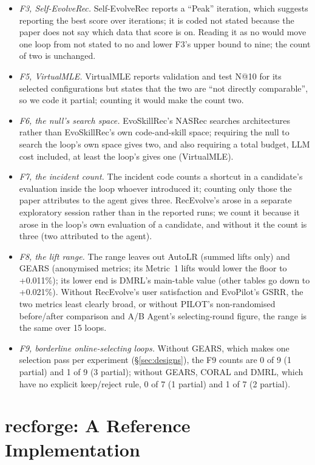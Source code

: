 \documentclass[sigconf,nonacm]{acmart}
\begin{document}
\begin{itemize}
\item \emph{F3, Self-EvolveRec.} Self-EvolveRec reports a ``Peak'' iteration, which suggests reporting the best score over iterations; it is coded not stated because the paper does not say which data that score is on. Reading it as no would move one loop from not stated to no and lower F3's upper bound to nine; the count of two is unchanged.
\item \emph{F5, VirtualMLE.} VirtualMLE reports validation and test N@10 for its selected configurations but states that the two are ``not directly comparable'', so we code it partial; counting it would make the count two.
\item \emph{F6, the null's search space.} EvoSkillRec's NASRec searches architectures rather than EvoSkillRec's own code-and-skill space; requiring the null to search the loop's own space gives two, and also requiring a total budget, LLM cost included, at least the loop's gives one (VirtualMLE).
\item \emph{F7, the incident count.} The incident code counts a shortcut in a candidate's evaluation inside the loop whoever introduced it; counting only those the paper attributes to the agent gives three. RecEvolve's arose in a separate exploratory session rather than in the reported runs; we count it because it arose in the loop's own evaluation of a candidate, and without it the count is three (two attributed to the agent).
\item \emph{F8, the lift range.} The range leaves out AutoLR (summed lifts only) and GEARS (anonymised metrics; its Metric~1 lifts would lower the floor to +0.011\%); its lower end is DMRL's main-table value (other tables go down to +0.021\%). Without RecEvolve's user satisfaction and EvoPilot's GSRR, the two metrics least clearly broad, or without PILOT's non-randomised before/after comparison and A/B Agent's selecting-round figure, the range is the same over 15 loops.
\item \emph{F9, borderline online-selecting loops.} Without GEARS, which makes one selection pass per experiment (\S\ref{sec:designs}), the F9 counts are 0 of 9 (1 partial) and 1 of 9 (3 partial); without GEARS, CORAL and DMRL, which have no explicit keep/reject rule, 0 of 7 (1 partial) and 1 of 7 (2 partial).
\end{itemize}

\section{recforge: A Reference Implementation}\label{app:recforge}
\end{document}
